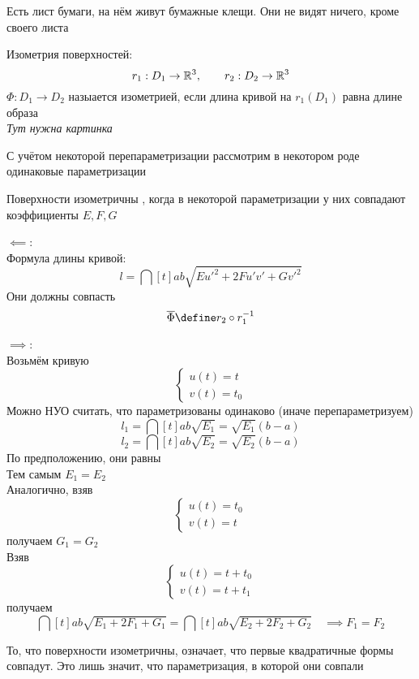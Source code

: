 Есть лист бумаги, на нём живут бумажные клещи. Они не видят ничего, кроме своего листа

\begin{definition}
	Изометрия поверхностей:
	$$ r_1 : D_1 \to \mathbb{R}^3, \qquad r_2 : D_2 \to \mathbb{R}^3 $$
	$ \Phi : D_1 \to D_2 $ назыается изометрией, если длина кривой на $ r_1(D_1) $ равна длине образа \\
	\textit{Тут нужна картинка}
\end{definition}

С учётом некоторой перепараметризации рассмотрим в некотором роде одинаковые параметризации

\begin{theorem}
	Поверхности изометричны , когда в некоторой параметризации у них совпадают коэффициенты $ E, F, G $
\end{theorem}

\begin{iproof}
	\item $ \impliedby $: \\
	Формула длины кривой:
	$$ l = \dint[t]{a}b{\sqrt{Eu'^2 + 2Fu'v' + Gv'^2}} $$
	Они должны совпасть
	$$ \ol{\Phi} \define r_2 \circ r_1^{-1} $$
	\item $ \implies $: \\
	Возьмём кривую
	$$
	\begin{cases}
		u(t) = t \\
		v(t) = t_0
	\end{cases} $$
	Можно НУО считать, что параметризованы одинаково (иначе перепараметризуем)
	$$ l_1 = \dint[t]{a}b{\sqrt{E_1}} = \sqrt{E_1}(b - a) $$
	$$ l_2 = \dint[t]{a}b{\sqrt{E_2}} = \sqrt{E_2}(b - a) $$
	По предположению, они равны \\
	Тем самым $ E_1 = E_2 $ \\
	Аналогично, взяв
	$$
	\begin{cases}
		u(t) = t_0 \\
		v(t) = t
	\end{cases} $$
	получаем $ G_1 = G_2 $ \\
	Взяв
	$$
	\begin{cases}
		u(t) = t + t_0 \\
		v(t) = t + t_1
	\end{cases} $$
	получаем
	$$ \dint[t]{a}b{\sqrt{E_1 + 2F_1 + G_1}} = \dint[t]{a}b{\sqrt{E_2 + 2F_2 + G_2}} \quad \implies F_1 = F_2 $$
\end{iproof}

\begin{remark}
	То, что поверхности изометричны,  означает, что первые квадратичные формы совпадут. Это лишь значит, что  параметризация, в которой они совпали
\end{remark}


